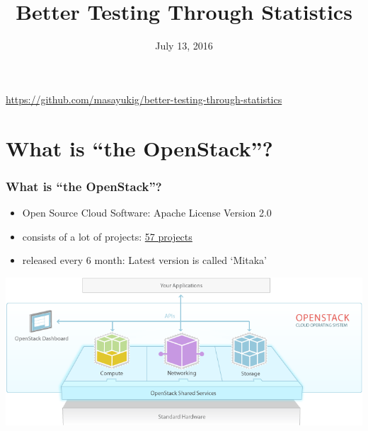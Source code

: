 \documentclass[aspectratio=43,11pt,hyperref={colorlinks=true}]{beamer}
\author[Matthew Treinish & Masayuki Igawa]{%
    \texorpdfstring{%
        \begin{columns}
            \column{.45\linewidth}
            \centering
            Matthew Treinish\\
            \href{mailto:mtreinish@kortar.org}{mtreinish@kortar.org}\\
        \texttt{mtreinish on Freenode}
        \column{.45\linewidth}
            \centering
            Masayuki Igawa\\
            \href{mailto:masayuki.igawa@gmail.com}{masayuki.igawa@gmail.com}\\
            \texttt{masayukig on Freenode}
        \end{columns}
        }
    {Matthew Treinish & Masayuki Igawa}
}
\date{July 13, 2016}
\title[Better Testing Through Statistics
\hspace{2em}\insertframenumber/\inserttotalframenumber]{Better Testing Through Statistics}
\begin{document}
{%
\begin{frame}[noframenumbering]
    \hypersetup{colorlinks,urlcolor=white}
    \titlepage{}
    \centering
    \href{https://github.com/masayukig/better-testing-through-statistics}{https://github.com/masayukig/better-testing-through-statistics}
\end{frame}
}

\section{What is ``the OpenStack''?}
\begin{frame}
  \frametitle{What is ``the OpenStack''?}
  \begin{itemize}
    \item Open Source Cloud Software: Apache License Version 2.0
    \item consists of a lot of projects: \href{http://governance.openstack.org/reference/projects/index.html}{57 projects}
    \item released every 6 month: Latest version is called `Mitaka'
  \end{itemize}
  \begin{center}
    \includegraphics[width=.65\textwidth]{openstack-software-diagram.png}
  \end{center}
\end{frame}
\end{document}
